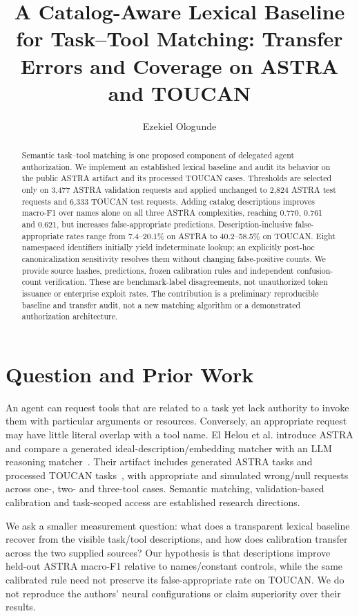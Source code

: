 \documentclass[sigconf,nonacm]{acmart}
\title{A Catalog-Aware Lexical Baseline for Task--Tool Matching: Transfer Errors and Coverage on ASTRA and TOUCAN}
\author{Ezekiel Ologunde}
\begin{document}
\begin{abstract}
Semantic task--tool matching is one proposed component of delegated agent authorization. We implement an established lexical baseline and audit its behavior on the public ASTRA artifact and its processed TOUCAN cases. Thresholds are selected only on 3,477 ASTRA validation requests and applied unchanged to 2,824 ASTRA test requests and 6,333 TOUCAN test requests. Adding catalog descriptions improves macro-F1 over names alone on all three ASTRA complexities, reaching 0.770, 0.761 and 0.621, but increases false-appropriate predictions. Description-inclusive false-appropriate rates range from 7.4--20.1\% on ASTRA to 40.2--58.5\% on TOUCAN. Eight namespaced identifiers initially yield indeterminate lookup; an explicitly post-hoc canonicalization sensitivity resolves them without changing false-positive counts. We provide source hashes, predictions, frozen calibration rules and independent confusion-count verification. These are benchmark-label disagreements, not unauthorized token issuance or enterprise exploit rates. The contribution is a preliminary reproducible baseline and transfer audit, not a new matching algorithm or a demonstrated authorization architecture.
\end{abstract}
\maketitle

\section{Question and Prior Work}
An agent can request tools that are related to a task yet lack authority to invoke them with particular arguments or resources. Conversely, an appropriate request may have little literal overlap with a tool name. El Helou et al. introduce ASTRA and compare a generated ideal-description/embedding matcher with an LLM reasoning matcher~\cite{astra}. Their artifact includes generated ASTRA tasks and processed TOUCAN tasks~\cite{toucan}, with appropriate and simulated wrong/null requests across one-, two- and three-tool cases. Semantic matching, validation-based calibration and task-scoped access are established research directions.

We ask a smaller measurement question: what does a transparent lexical baseline recover from the visible task/tool descriptions, and how does calibration transfer across the two supplied sources? Our hypothesis is that descriptions improve held-out ASTRA macro-F1 relative to names/constant controls, while the same calibrated rule need not preserve its false-appropriate rate on TOUCAN. We do not reproduce the authors' neural configurations or claim superiority over their results.
\end{document}
